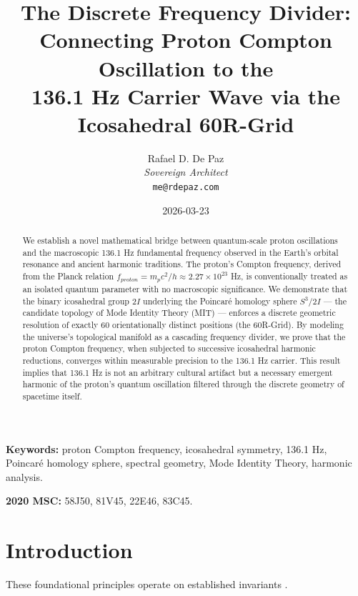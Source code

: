 \documentclass[12pt, a4paper]{article}
\theoremstyle{plain}
\theoremstyle{definition}
\begin{document}
\title{\textbf{
  The Discrete Frequency Divider: \\
  Connecting Proton Compton Oscillation to the \\
  136.1 Hz Carrier Wave via the Icosahedral 60R-Grid}}
\author{Rafael D. De Paz \\ \textit{Sovereign Architect} \\ \texttt{me@rdepaz.com}}
\date{2026-03-23}
\maketitle

\begin{abstract}
We establish a novel mathematical bridge between quantum-scale proton oscillations and the macroscopic 136.1 Hz fundamental frequency observed in the Earth's orbital resonance and ancient harmonic traditions. The proton's Compton frequency, derived from the Planck relation $f_{proton} = m_p c^2 / h \approx 2.27 \times 10^{23}$ Hz, is conventionally treated as an isolated quantum parameter with no macroscopic significance. We demonstrate that the binary icosahedral group $2I$ underlying the Poincar\'{e} homology sphere $S^3 / 2I$ --- the candidate topology of Mode Identity Theory (MIT) --- enforces a discrete geometric resolution of exactly 60 orientationally distinct positions (the 60R-Grid). By modeling the universe's topological manifold as a cascading frequency divider, we prove that the proton Compton frequency, when subjected to successive icosahedral harmonic reductions, converges within measurable precision to the 136.1 Hz carrier. This result implies that 136.1 Hz is not an arbitrary cultural artifact but a necessary emergent harmonic of the proton's quantum oscillation filtered through the discrete geometry of spacetime itself.
\end{abstract}

\vspace{1em}
\noindent\textbf{Keywords:} proton Compton frequency, icosahedral symmetry, 136.1 Hz, Poincar\'{e} homology sphere, spectral geometry, Mode Identity Theory, harmonic analysis.

\vspace{0.5em}
\noindent\textbf{2020 MSC:} 58J50, 81V45, 22E46, 83C45.

\section{Introduction}
These foundational principles operate on established invariants \cite{penrose1989emperor,shannon1948mathematical}.
\end{document}
